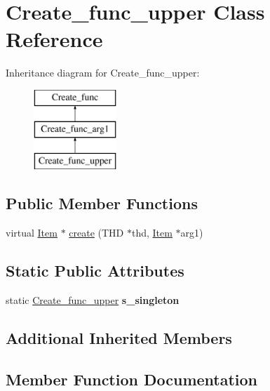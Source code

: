 \hypertarget{classCreate__func__upper}{}\section{Create\+\_\+func\+\_\+upper Class Reference}
\label{classCreate__func__upper}
Inheritance diagram for Create\+\_\+func\+\_\+upper\+:\begin{figure}[H]
\begin{center}
\leavevmode
\includegraphics[height=3.000000cm]{classCreate__func__upper}
\end{center}
\end{figure}
\subsection*{Public Member Functions}
\begin{DoxyCompactItemize}
\item 
virtual \mbox{\hyperlink{classItem}{Item}} $\ast$ \mbox{\hyperlink{classCreate__func__upper_af0a8db38f89d728e735cfdb393d5b807}{create}} (T\+HD $\ast$thd, \mbox{\hyperlink{classItem}{Item}} $\ast$arg1)
\end{DoxyCompactItemize}
\subsection*{Static Public Attributes}
\begin{DoxyCompactItemize}
\item 
\mbox{\label{classCreate__func__upper_ac342b44ee820a1d71a853e13d990dd37}} 
static \mbox{\hyperlink{classCreate__func__upper}{Create\+\_\+func\+\_\+upper}} {\bfseries s\+\_\+singleton}
\end{DoxyCompactItemize}
\subsection*{Additional Inherited Members}


\subsection{Member Function Documentation}
\mbox{\label{classCreate__func__upper_af0a8db38f89d728e735cfdb393d5b807}} 
